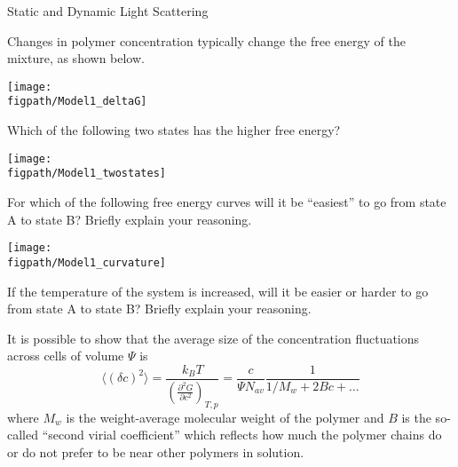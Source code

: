 \begin{activity}{Static and Dynamic Light Scattering}
\begin{model}
	\label{\labelbase:mdl:SLS}

Changes in polymer concentration typically change the free energy of the mixture, as shown below.
	
	\centerline{\texttt{[image: \\figpath/Model1\_deltaG]}}
	
\end{model}

\begin{ctqs}
	
		\question Which of the following two states has the higher free energy?
	
	\vspace{6pt}
	\centerline{\texttt{[image: \\figpath/Model1\_twostates]}}
	
			\begin{solution}[0.25in]
			\end{solution}
			
		\question For which of the following free energy curves will it be ``easiest'' to go from state A to state B?  Briefly explain your reasoning.  \label{\labelbase:ctq:delGcurvature}
	
	\centerline{\texttt{[image: \\figpath/Model1\_curvature]}}
	
			\begin{solution}[1in]
			\end{solution}
			
	\question If the temperature of the system is increased, will it be easier or harder to go from state A to state B?  Briefly explain your reasoning. \label{\labelbase:ctq:temperature}
	
			\begin{solution}[1in]
			\end{solution}
	
\end{ctqs}

\begin{infobox}
	It is possible to show that the average size of the concentration fluctuations across cells of volume $\Psi$ is
	\begin{equation*}
		\langle (\delta c)^2\rangle = \frac{k_BT}{\left( \frac{\partial^2 G}{\partial c^2}\right)_{T,p}} = \frac{c}{\Psi N_{av}} \frac{1}{1/M_w + 2Bc + \dots}
	\end{equation*}
	where $M_w$ is the weight-average molecular weight of the polymer and $B$ is the so-called ``second virial coefficient'' which reflects how much the polymer chains do or do not prefer to be near other polymers in solution.
\end{infobox}


\end{activity}
